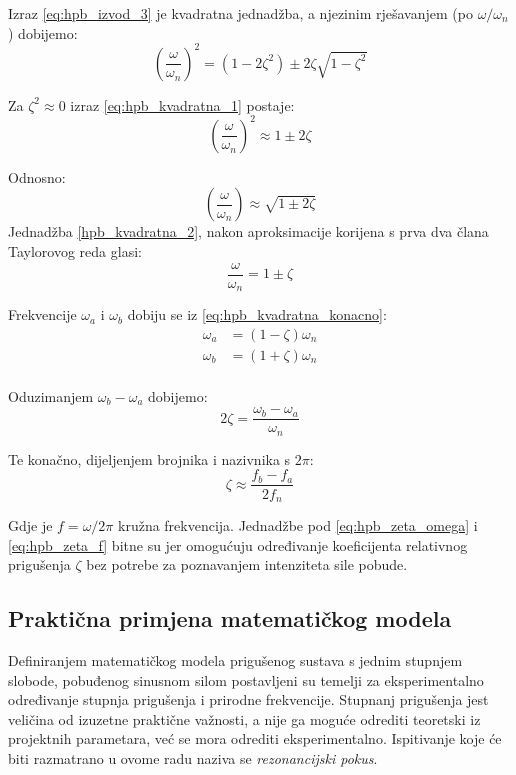 Izraz \eqref{eq:hpb_izvod_3} je kvadratna jednadžba, a njezinim rješavanjem (po
$\omega/\omega_n$) dobijemo:
\begin{equation}\label{eq:hpb_kvadratna_1}
    \left(\frac{\omega}{\omega_n}\right)^2 = 
        (1-2\zeta^2)\pm 2\zeta\sqrt{1-\zeta^2}
\end{equation}

Za $\zeta^2 \approx 0$ izraz \eqref{eq:hpb_kvadratna_1} postaje:
\begin{equation}
    \left(\frac{\omega}{\omega_n}\right)^2 \approx
        1 \pm 2\zeta
\end{equation}

Odnosno:
\begin{equation}\label{eq:hpb_kvadratna_2}
    \left(\frac{\omega}{\omega_n}\right)\approx
        \sqrt{1 \pm 2\zeta}
\end{equation}
Jednadžba \eqref{hpb_kvadratna_2}, nakon aproksimacije korijena s prva dva člana Taylorovog
reda glasi:
\begin{equation}\label{eq:hpb_kvadratna_konacno}
    \frac{\omega}{\omega_n} = 1 \pm \zeta
\end{equation}

Frekvencije $\omega_a$ i $\omega_b$ dobiju se iz \eqref{eq:hpb_kvadratna_konacno}:
\begin{align}
    \omega_a &= (1-\zeta)\omega_n\\
    \omega_b &= (1+\zeta)\omega_n\\
\end{align}

Oduzimanjem $\omega_b-\omega_a$ dobijemo:
\begin{equation}\label{eq:hpb_zeta_omega}
        2\zeta = \frac{\omega_b-\omega_a}{\omega_n}
\end{equation}

Te konačno, dijeljenjem brojnika i nazivnika s $2\pi$:
\begin{equation}\label{eq:hpb_zeta_f}
    \zeta\approx\frac{f_b-f_a}{2f_n}
\end{equation}

Gdje je $f=\omega/2\pi$ kružna frekvencija. Jednadžbe pod \eqref{eq:hpb_zeta_omega}
i \eqref{eq:hpb_zeta_f} bitne su jer omogućuju određivanje koeficijenta relativnog prigušenja
$\zeta$ bez potrebe za poznavanjem intenziteta sile pobude. 

\subsection{Praktična primjena matematičkog modela}
Definiranjem matematičkog modela prigušenog sustava s jednim stupnjem slobode,
pobuđenog sinusnom silom postavljeni su temelji za eksperimentalno određivanje
stupnja prigušenja i prirodne frekvencije. Stupnanj prigušenja jest veličina od
izuzetne praktične važnosti, a nije ga moguće odrediti teoretski iz projektnih
parametara, već se mora odrediti eksperimentalno. %
Ispitivanje koje će biti razmatrano u ovome radu naziva se \textit{rezonancijski
pokus}.

